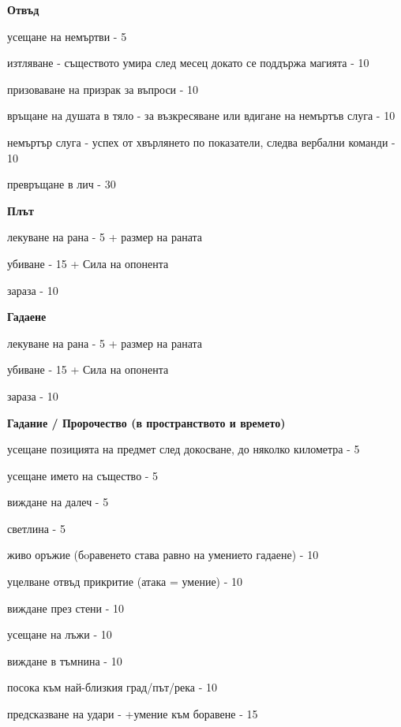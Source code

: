 \textbf{Отвъд}
\begin{itemize*}
  \item{усещане на немъртви - 5}
  \item{изтляване - съществото умира след месец  докато се поддържа магията - 10}
  \item{призоваване на призрак за въпроси - 10}
  \item{връщане на душата в тяло - за възкресяване или вдигане на немъртъв слуга - 10}
  \item{немъртър слуга - успех от хвърлянето по показатели, следва вербални команди - 10}
  \item{превръщане в лич - 30}
\end{itemize*}


\textbf{Плът}
\begin{itemize*}
  \item{лекуване на рана - 5 + размер на раната}
  \item{убиване - 15 + Сила на опонента}
  \item{зараза - 10}
\end{itemize*}


\textbf{Гадаене}
\begin{itemize*}
  \item{лекуване на рана - 5 + размер на раната}
  \item{убиване - 15 + Сила на опонента}
  \item{зараза - 10}
\end{itemize*}


\vspace{1cm}
\textbf{Гадание / Пророчество (в пространството и времето)}
\begin{itemize*}
  \item{усещане позицията на предмет след докосване, до няколко километра - 5}
  \item{усещане името на същество - 5}
  \item{виждане на далеч - 5}
  \item{светлина - 5}
  \item{живо оръжие (бoравенето става равно на умението гадаене) - 10}
  \item{уцелване отвъд прикритие (атака = умение) - 10}
  \item{виждане през стени - 10}
  \item{усещане на лъжи - 10}
  \item{виждане в тъмнина - 10}
  \item{посока към най-близкия град/път/река - 10}
  \item{предсказване на удари - +умение към боравене - 15}
\end{itemize*}


